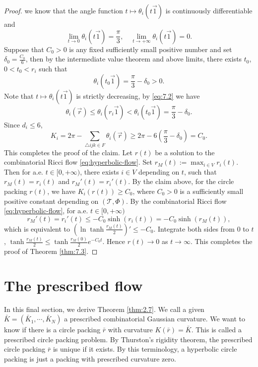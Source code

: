 \documentclass[12pt]{amsart}
\numberwithin{equation}{section}
\begin{document}
\begin{proof}
we know that the angle function $t \mapsto \theta_i(t\vec{1})$ is continuously differentiable and
\[
\lim_{t \to 0} \theta_i(t\vec{1}) = \frac{\pi}{3}, \quad \lim_{t \to +\infty} \theta_i(t\vec{1}) = 0.
\]
Suppose that $C_0 > 0$ is any fixed sufficiently small positive number and set $\delta_0 = \frac{C_0}{6}$, then by the
intermediate value theorem and above limits, there exists $t_0$, $0 < t_0 < r_i$ such that
\[
\theta_i(t_0\vec{1}) = \frac{\pi}{3} - \delta_0 > 0.
\]
Note that $t \mapsto \theta_i(t\vec{1})$ is strictly decreasing, by \eqref{eq:7.2} we have
\[
\theta_i(\vec{r}) \leq \theta_i(r_i\vec{1}) < \theta_i(t_0\vec{1}) = \frac{\pi}{3} - \delta_0.
\]
Since $d_i \leq 6$,
\[
K_i = 2\pi - \sum_{\triangle ijk \in F} \theta_i(\vec{r}) \geq 2\pi - 6\left(\frac{\pi}{3} - \delta_0\right) = C_0.
\]
This completes the proof of the claim. Let $r(t)$ be a solution to the combinatorial Ricci flow \eqref{eq:hyperbolic-flow}.
Set $r_M(t) := \max_{i \in V} r_i(t)$. Then for a.e. $t \in [0,+\infty)$, there exists $i \in V$ depending on $t$, such that
$r_M(t) = r_i(t)$ and $r_M'(t) = r_i'(t)$. By the claim above, for the circle packing $r(t)$, we have $K_i(r(t)) \geq C_0$,
where $C_0 > 0$ is a sufficiently small positive constant depending on $(\mathcal{T},\Phi)$. By the combinatorial Ricci
flow \eqref{eq:hyperbolic-flow}, for a.e. $t \in [0,+\infty)$
\[
r_M'(t) = r_i'(t) \leq -C_0 \sinh(r_i(t)) = -C_0 \sinh(r_M(t)),
\]
which is equivalent to $(\ln \tanh \frac{r_M(t)}{2})' \leq -C_0$. Integrate both sides from $0$ to $t$, $\tanh \frac{r_M(t)}{2} \leq
\tanh \frac{r_M(0)}{2} e^{-C_0 t}$. Hence $r(t) \to 0$ as $t \to \infty$. This completes the proof of Theorem \ref{thm:7.3}.
\end{proof}

\section{The prescribed flow}\label{sec:prescribed}

In this final section, we derive Theorem \ref{thm:2.7}. We call a given $\bar{K} = (\bar{K}_1, \cdots, \bar{K}_N)$ a prescribed combinatorial
Gaussian curvature. We want to know if there is a circle packing $\bar{r}$ with curvature $K(\bar{r}) = \bar{K}$. This is
called a prescribed circle packing problem. By Thurston's rigidity theorem, the prescribed circle packing
$\bar{r}$ is unique if it exists. By this terminology, a hyperbolic circle packing is just a packing with prescribed
curvature zero.
\end{document}
